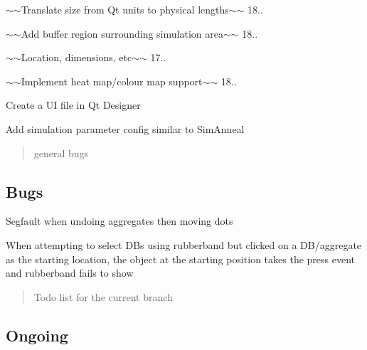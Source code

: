 \begin{DoxyItemize}
\begin{DoxyItemize}
\item $\sim$$\sim$\+Translate size from Qt units to physical lengths$\sim$$\sim$ 18..
\item $\sim$$\sim$\+Add buffer region surrounding simulation area$\sim$$\sim$ 18..
\item $\sim$$\sim$\+Location, dimensions, etc$\sim$$\sim$ 17..
\item $\sim$$\sim$\+Implement heat map/colour map support$\sim$$\sim$ 18..
\item Create a UI file in Qt Designer
\item Add simulation parameter config similar to Sim\+Anneal
\end{DoxyItemize}
\end{DoxyItemize}

\begin{quote}
general bugs \end{quote}
\subsection*{Bugs}


\begin{DoxyItemize}
\item Segfault when undoing aggregates then moving dots
\item When attempting to select D\+Bs using rubberband but clicked on a D\+B/aggregate as the starting location, the object at the starting position takes the press event and rubberband fails to show
\end{DoxyItemize}

\begin{quote}
Todo list for the current branch \end{quote}
\subsection*{Ongoing}


